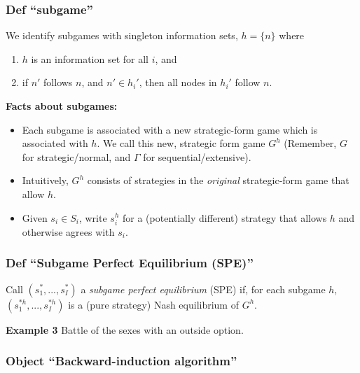\documentclass[
]{article}
\providecommand{\tightlist}{%
  \setlength{\itemsep}{0pt}\setlength{\parskip}{0pt}}
\begin{document}
\hypertarget{def-subgame}{%
\subsubsection{Def ``subgame''}\label{def-subgame}}

We identify subgames with singleton information sets, \(h = \{n\}\)
where

\begin{enumerate}
\def\labelenumi{\arabic{enumi}.}
\tightlist
\item
  \(h\) is an information set for all \(i\), and
\item
  if \(n'\) follows \(n\), and \(n' \in h_i'\), then all nodes in
  \(h_i'\) follow \(n\).
\end{enumerate}

\textbf{Facts about subgames:}

\begin{itemize}
\tightlist
\item
  Each subgame is associated with a new strategic-form game which is
  associated with \(h\). We call this new, strategic form game \(G^h\)
  (Remember, \(G\) for strategic/normal, and \(\Gamma\) for
  sequential/extensive).
\item
  Intuitively, \(G^h\) consists of strategies in the \emph{original}
  strategic-form game that allow \(h\).
\item
  Given \(s_i \in S_i\), write \(s_i^h\) for a (potentially different)
  strategy that allows \(h\) and otherwise agrees with \(s_i\).
\end{itemize}

\hypertarget{def-subgame-perfect-equilibrium-spe}{%
\subsubsection{Def ``Subgame Perfect Equilibrium
(SPE)''}\label{def-subgame-perfect-equilibrium-spe}}

Call \((s_1^*, ..., s_I^*)\) a \emph{subgame perfect equilibrium} (SPE)
if, for each subgame \(h\), \((s_1^{*h}, ..., s_I^{*h})\) is a (pure
strategy) Nash equilibrium of \(G^h\).

\textbf{Example 3} Battle of the sexes with an outside option.

\hypertarget{object-backward-induction-algorithm}{%
\subsubsection{Object ``Backward-induction
algorithm''}\label{object-backward-induction-algorithm}}
\end{document}
